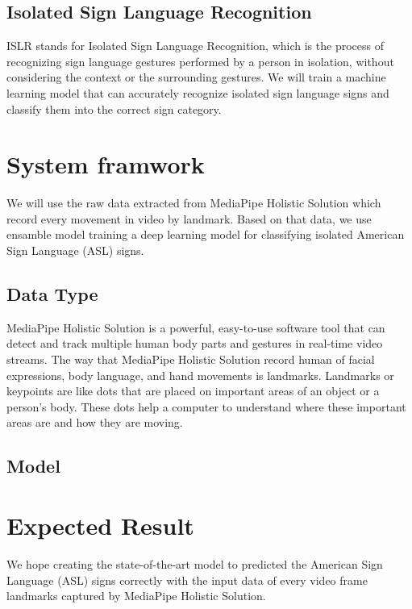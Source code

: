 \documentclass[10pt,twocolumn,letterpaper]{article}
\begin{document}
\begin{CJK*}{UTF8}{bsmi}
\subsection{Isolated Sign Language Recognition}

ISLR stands for Isolated Sign Language Recognition, 
which is the process of recognizing sign language gestures performed by a person in isolation, 
without considering the context or the surrounding gestures. 
We will train a machine learning model that can accurately recognize isolated sign language signs and classify them into the correct sign category.

\section{System framwork}
\label{sec:formatting}

We will use the raw data extracted from MediaPipe Holistic Solution which record every movement in video by landmark.
Based on that data, we use ensamble model training a deep learning model for classifying isolated American Sign Language (ASL) signs.

\subsection{Data Type}

MediaPipe Holistic Solution is a powerful, easy-to-use software tool that can detect and track multiple human body parts and gestures in real-time video streams. 
The way that MediaPipe Holistic Solution record human of facial expressions, body language, and hand movements is landmarks.
Landmarks or keypoints are like dots that are placed on important areas of an object or a person's body. 
These dots help a computer to understand where these important areas are and how they are moving.

\subsection{Model}

\section{Expected Result}
We hope creating the state-of-the-art model to predicted the American Sign Language (ASL) signs correctly
with the input data of every video frame landmarks captured by MediaPipe Holistic Solution.




% 
% 

\end{CJK*}
\end{document}
